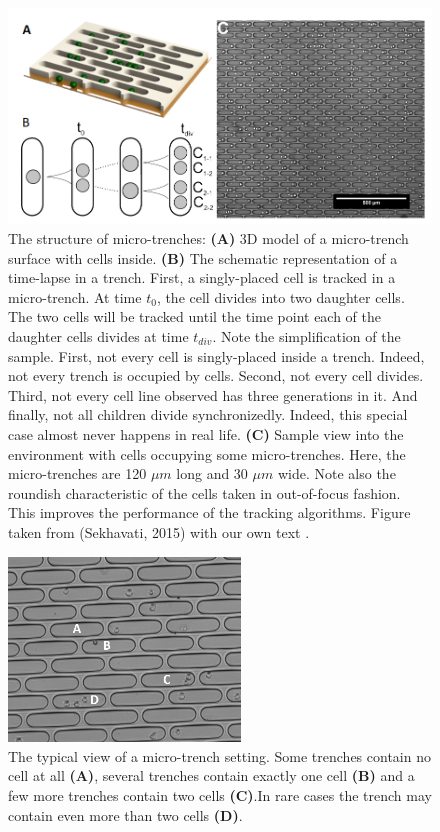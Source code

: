 \documentclass[pdftex,12pt,a4paper]{report}
\begin{document}
\begin{figure}[H]
\centering
\includegraphics[width=.9\textwidth]{images/trenches-sekhavati}
\caption[The structure of micro-trenches]{The structure of micro-trenches: \textbf{(A)} 3D model of a micro-trench  surface with cells inside. \textbf{(B)} The schematic representation of a time-lapse in a trench. First, a singly-placed cell is tracked in a micro-trench. At time $t_0$, the cell divides into two daughter cells. The two cells will be tracked until the time point each of the daughter cells divides at time $t_{div}$. Note the simplification of the sample. First, not every cell is singly-placed inside a trench. Indeed, not every trench is occupied by cells. Second, not every cell divides. Third, not every cell line observed has three generations in it. And finally, not all children divide synchronizedly. Indeed, this special case almost never happens in real life. \textbf{(C)} Sample view into the environment with cells occupying some micro-trenches. Here, the micro-trenches are 120 $\mu m$ long and 30 $\mu m$ wide. Note also the roundish characteristic of the cells taken in out-of-focus fashion. This improves the performance of the tracking algorithms. Figure taken from (Sekhavati, 2015) with our own text  \cite{sekhavati2015dynamic}.}
\label{fig:microtrench_design}
\end{figure}

\begin{figure}[H]
\centering
\includegraphics[width=0.55\textwidth]{images/microtrench_in}
\caption[The typical view of a micro-trench setting]{The typical view of a micro-trench setting. Some trenches contain no cell at all \textbf{(A)}, several trenches contain exactly one cell \textbf{(B)} and a few more trenches contain two cells \textbf{(C)}.In rare cases the trench may contain even more than two cells \textbf{(D)}.}
\label{fig:microtrench_sample}
\end{figure}
\end{document}
